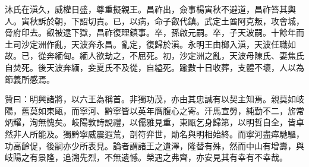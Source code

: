 \begin{pinyinscope}
沐氏在滇久，威權日盛，尊重擬親王。昌祚出，僉事楊寅秋不避道，昌祚笞其輿人。寅秋訴於朝，下詔切責。已，以病，命子叡代鎮。武定土酋阿克叛，攻會城，脅府印去。叡被逮下獄，昌祚復理鎮事。卒，孫啟元嗣。卒，子天波嗣。十餘年而土司沙定洲作亂，天波奔永昌。亂定，復歸於滇。永明王由榔入滇，天波任職如故。已，從奔緬甸。緬人欲劫之，不屈死。初，沙定洲之亂，天波母陳氏、妻焦氏自焚死。後天波奔緬，妾夏氏不及從，自縊死。踰數十日收葬，支體不壞，人以為節義所感焉。

贊曰：明興諸將，以六王為稱首。非獨功茂，亦由其忠誠有以契主知焉。親莫如岐陽，舊莫如東甌，而寧河、黔寧皆以英年膺腹心之寄。汗馬宣勞，純勤不二，旂常炳耀，洵無愧矣。岐陽敦詩說禮，以儒雅見重，東甌乞身歸第，以明哲自全，皆卓然非人所能及。獨黔寧威震遐荒，剖符弈世，勛名與明相始終。而寧河盡瘁馳驅，功高齡促，後嗣亦少所表見。論者謂諸王之遺澤，隆替有殊，然而中山有增壽，與岐陽之有景隆，追溯先烈，不無遺憾。榮遇之弗齊，亦安見其有幸有不幸哉。


\end{pinyinscope}